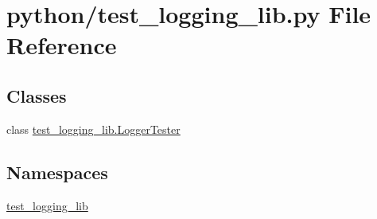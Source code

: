 \section{python/test\-\_\-logging\-\_\-lib.py File Reference}
\label{test__logging__lib_8py}
\subsection*{Classes}
\begin{DoxyCompactItemize}
\item 
class \hyperlink{classtest__logging__lib_1_1LoggerTester}{test\-\_\-logging\-\_\-lib.\-Logger\-Tester}
\end{DoxyCompactItemize}
\subsection*{Namespaces}
\begin{DoxyCompactItemize}
\item 
\hyperlink{namespacetest__logging__lib}{test\-\_\-logging\-\_\-lib}
\end{DoxyCompactItemize}
